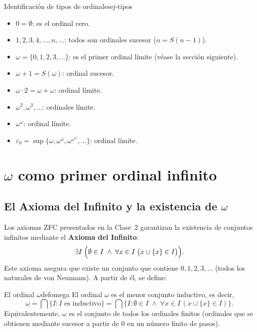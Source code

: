 \begin{ejemplo}{Identificación de tipos de ordinales}{ej-tipos}
\begin{itemize}[leftmargin=2em]
  \item $0 = \emptyset$: es el ordinal cero.
  \item $1, 2, 3, 4, \ldots, n, \ldots$: todos son ordinales sucesor ($n = S(n-1)$).
  \item $\omega = \{0, 1, 2, 3, \ldots\}$: es el primer ordinal límite (véase la sección siguiente).
  \item $\omega + 1 = S(\omega)$: ordinal sucesor.
  \item $\omega \cdot 2 = \omega + \omega$: ordinal límite.
  \item $\omega^2, \omega^3, \ldots$: ordinales límite.
  \item $\omega^\omega$: ordinal límite.
  \item $\varepsilon_0 = \sup\{\omega, \omega^\omega, \omega^{\omega^\omega}, \ldots\}$: ordinal límite.
\end{itemize}
\end{ejemplo}

\section{\texorpdfstring{$\omega$}{omega} como primer ordinal infinito}

\subsection{El Axioma del Infinito y la existencia de $\omega$}

Los axiomas ZFC presentados en la Clase~2 garantizan la existencia de conjuntos infinitos mediante el \textbf{Axioma del Infinito}:
\[
  \exists I\;\Bigl(\emptyset \in I \;\wedge\; \forall x \in I\;\bigl(x \cup \{x\} \in I\bigr)\Bigr).
\]
Este axioma asegura que existe un conjunto que contiene $0, 1, 2, 3, \ldots$ (todos los naturales de von Neumann). A partir de él, se define:

\begin{definicion}{El ordinal $\omega$}{defomega}
El ordinal $\omega$ es el menor conjunto inductivo, es decir,
\[
  \omega = \bigcap\{I : I \text{ es inductivo}\} = \bigcap\bigl\{I : \emptyset \in I \;\wedge\; \forall x \in I\,(x \cup \{x\} \in I)\bigr\}.
\]
Equivalentemente, $\omega$ es el conjunto de todos los ordinales finitos (ordinales que se obtienen mediante sucesor a partir de $0$ en un número finito de pasos).
\end{definicion}

